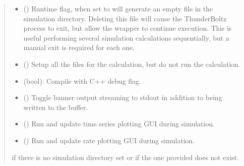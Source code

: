 \documentclass[letterpaper,10pt,english,openany,oneside]{sphinxmanual}
\begin{document}
\begin{fulllineitems}
\begin{fulllineitems}
\begin{quote}
\begin{description}
\begin{itemize}
\item {} 
\sphinxAtStartPar
{} () \textendash{} Runtime flag, when set to  will generate
an empty  file in the simulation directory. Deleting this
file will cause the ThunderBoltz process to exit, but allow
the wrapper to continue execution. This is useful performing
several simulation calculations sequentially, but a manual exit
is required for each one.

\item {} 
\sphinxAtStartPar
{} () \textendash{} Setup all the files for the calculation, but do not
run the calculation.

\item {} 
\sphinxAtStartPar
{} \textendash{} (bool): Compile with C++  debug flag.

\item {} 
\sphinxAtStartPar
{} () \textendash{} Toggle banner output streaming to stdout in
addition to being written to the  buffer.

\item {} 
\sphinxAtStartPar
{} () \textendash{} Run and update time series plotting GUI during simulation.

\item {} 
\sphinxAtStartPar
{} () \textendash{} Run and update rate plotting GUI during simulation.

\end{itemize}

\sphinxAtStartPar
{} \textendash{} if there is no simulation directory set or if
    the one provided does not exist.


\end{description}
\end{quote}
\end{fulllineitems}
\end{fulllineitems}
\end{document}
